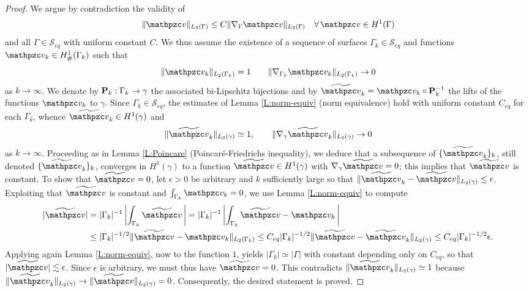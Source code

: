 \begin{proof}
We argue by contradiction the validity of
%
\[
\|\tv\|_{L_2(\Gamma)} \le C \|\nabla_\Gamma \tv\|_{L_2(\Gamma)}
    \quad\forall \, \tv\in H^1(\Gamma)
\]
%
and all $\Gamma\in\mathcal{S}_{eq}$ with uniform constant $C$. We thus assume the existence of a sequence of surfaces $\Gamma_k \in \mathcal{S}_{eq}$ and functions $\tv_k \in H^1_\#(\Gamma_k)$ such that
%
\[
\|\tv_k\|_{L_2(\Gamma_k)}=1
\qquad
\|\nabla_{\Gamma_k} \tv_k\|_{L_2(\Gamma_k)} \rightarrow 0
\]
%
as $k \rightarrow \infty$.  We denote by ${\bf P}_k: \Gamma_k \rightarrow \gamma$ the associated bi-Lipschitz bijections and by $\widetilde{\tv}_k = \tv_k \circ \bP_k^{-1}$ the lifts of the functions $\tv_k$ to $\gamma$. Since $\Gamma_k\in\mathcal{S}_{eq}$, the estimates of Lemma \ref{L:norm-equiv} (norm equivalence) hold with uniform constant $C_{eq}$ for each $\Gamma_k$, whence $\wv_k \in H^1(\gamma)$ and
%
\[
\|\wv_k\|_{L_2(\gamma)} \simeq 1 ,\qquad
\|\nabla_\gamma\wv_k\|_{L_2(\gamma)} \rightarrow 0
\]
%
as $k \rightarrow \infty$. Proceeding as in Lemma \ref{L:Poincare}
(Poincar\'e-Friedrichs inequality), we deduce that a subsequence
of $\{\wv_k\}_k$, still denoted $\{\wv_k\}_k$, converges in $H^1(\gamma)$ to a function
$\wv\in H^1(\gamma)$ with $\nabla_\gamma\wv=0$; this implies that $\wv$ is constant. To show that $\wv=0$, let
$\epsilon>0$ be arbitrary and $k$ sufficiently large so that $\|\wv_k-\wv\|_{L_2(\gamma)} \le \epsilon$. Exploiting that $\widetilde{\tv}$ is constant and $\int_{\Gamma_k}\tv_k=0$, we use Lemma \ref{L:norm-equiv} to compute
%
\[
\begin{aligned}
|\widetilde{\tv}| & =|\Gamma_k|^{-1} \left | \int_{\Gamma_k} \widetilde{\tv} \, \right | = |\Gamma_k|^{-1} \left | \int_{\Gamma_k} \widetilde{\tv}-\tv_k \, \right | 
\\ & \le |\Gamma_k|^{-1/2} \|\widetilde{\tv}-\tv_k\|_{L_2(\Gamma_k)} \le C_{eq} |\Gamma_k|^{-1/2} \|\widetilde{\tv}-\widetilde{\tv}_k\|_{L_2(\gamma)} \le C_{eq} |\Gamma_k|^{-1/2} \epsilon.
\end{aligned}
\]
Applying again Lemma \ref{L:norm-equiv}, now to the function $1$, yields $|\Gamma_k|\simeq |\Gamma|$ with constant depending only on $C_{eq}$, so that $|\widetilde{\tv}| \lesssim \epsilon$. Since $\epsilon$ is arbitrary, we must thus  have $\widetilde{\tv}=0$.  This contradicts $\|\widetilde{\tv}_k\|_{L_2(\gamma)} \simeq 1$ because $\|\widetilde{\tv}_k\|_{L_2(\gamma)} \rightarrow \|\wv\|_{L_2(\gamma)}=0$. Consequently, the desired statement is proved.
\end{proof}


